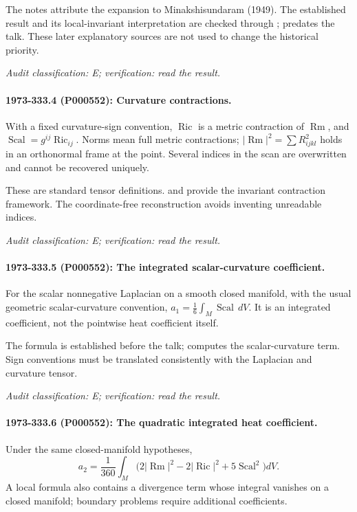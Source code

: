 The notes attribute the expansion to Minakshisundaram (1949). The established result and its local-invariant interpretation are checked through \citet[introduction]{gilkey1979recursion}; \citet{mckeansinger1967curvature} predates the talk. These later explanatory sources are not used to change the historical priority.

\emph{Audit classification: E; verification: read the result.}

\paragraph{1973-333.4 (P000552): Curvature contractions.}
With a fixed curvature-sign convention, \(\operatorname{Ric}\) is a metric contraction of \(\operatorname{Rm}\), and \(\operatorname{Scal}=g^{ij}\operatorname{Ric}_{ij}\). Norms mean full metric contractions; \(|\operatorname{Rm}|^2=\sum R_{ijkl}^2\) holds in an orthonormal frame at the point. Several indices in the scan are overwritten and cannot be recovered uniquely.

These are standard tensor definitions. \citet[\S7]{mckeansinger1967curvature} and \citet[\S1]{gilkey1979recursion} provide the invariant contraction framework. The coordinate-free reconstruction avoids inventing unreadable indices.

\emph{Audit classification: E; verification: read the result.}

\paragraph{1973-333.5 (P000552): The integrated scalar-curvature coefficient.}
For the scalar nonnegative Laplacian on a smooth closed manifold, with the usual geometric scalar-curvature convention, \(a_1=\frac16\int_M\operatorname{Scal}\,dV\). It is an integrated coefficient, not the pointwise heat coefficient itself.

The formula is established before the talk; \citet[\S1, equation (5a), and \S4]{mckeansinger1967curvature} computes the scalar-curvature term. Sign conventions must be translated consistently with the Laplacian and curvature tensor.

\emph{Audit classification: E; verification: read the result.}

\paragraph{1973-333.6 (P000552): The quadratic integrated heat coefficient.}
Under the same closed-manifold hypotheses, \[a_2=\frac1{360}\int_M\bigl(2|\operatorname{Rm}|^2-2|\operatorname{Ric}|^2+5\operatorname{Scal}^2\bigr)dV.\] A local formula also contains a divergence term whose integral vanishes on a closed manifold; boundary problems require additional coefficients.

